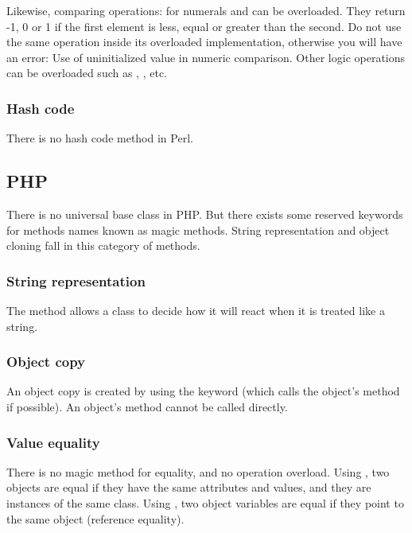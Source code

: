 \documentclass{KodeBook}
\begin{document}
Likewise, comparing operations: \keyword{<=>} for numerals and  can be overloaded. 
They return -1, 0 or 1 if the first element is less, equal or greater than the second.
Do not use the same operation inside its overloaded implementation, otherwise you will have an error: Use of uninitialized value in numeric comparison.
Other logic operations can be overloaded such as \keyword{>}, \keyword{<}, etc.

\subsubsection{Hash code}

There is no hash code method in Perl.

\subsection{PHP}

There is no universal base class in PHP.
But there exists some reserved keywords for methods names known as magic methods.
String representation and object cloning fall in this category of methods.

\subsubsection{String representation}

The  method allows a class to decide how it will react when it is treated like a string.



\subsubsection{Object copy}

An object copy is created by using the  keyword (which calls the object's  method if possible). An object's  method cannot be called directly.



\subsubsection{Value equality}

There is no magic method for equality, and no operation overload. 
Using \keyword{==}, two objects are equal if they have the same attributes and values, and they are instances of the same class.
Using \keyword{===}, two object variables are equal if they point to the same object (reference equality).
\end{document}
